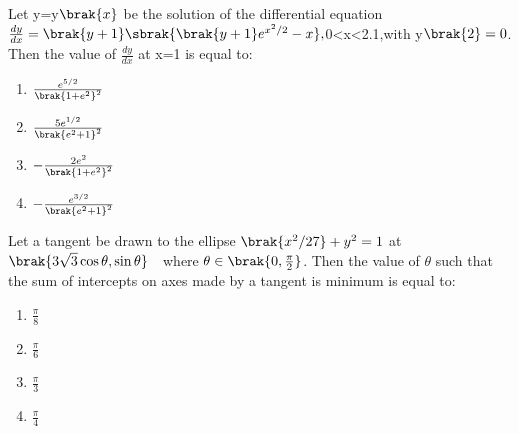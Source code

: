 \item Let y=y$\brak{x}$ be the solution of the differential equation $\frac{dy}{dx}=\brak{y+1}\sbrak{\brak{y+1}e^{x^2/2}-x} ,$0\textless x\textless 2.1,with y$\brak{2}=0$. Then the value of $\frac{dy}{dx}$ at x=1 is equal to:
\hfill{}
	\begin{enumerate}
\item $\frac{e^{5/2}}{\brak{1 + e^{2}}^{2}} $
\item $ \frac{5 e^{1/2}}{\brak{e^{2} + 1}^{2}} $
\item $ -\frac{2 e^{2}}{\brak{1 + e^{2}}^{2}} $
\item $ -\frac{e^{3/2}}{\brak{e^{2} + 1}^{2}} $
\end{enumerate}
\item Let a tangent be drawn to the ellipse $\brak{x^2/27}+y^2=1$ at $\brak{3\sqrt{3} \cos \theta, \sin \theta} \quad $where $ \theta \in \brak{0, \frac{\pi}{2}}$.  Then the value of $\theta$ such that the sum of intercepts on axes made by a tangent is minimum is equal to:
\hfill{}
	\begin{enumerate}
    \item $\frac{\pi}{8}$
    \item $\frac{\pi}{6}$
    \item $\frac{\pi}{3}$
    \item $\frac{\pi}{4}$
\end{enumerate}
